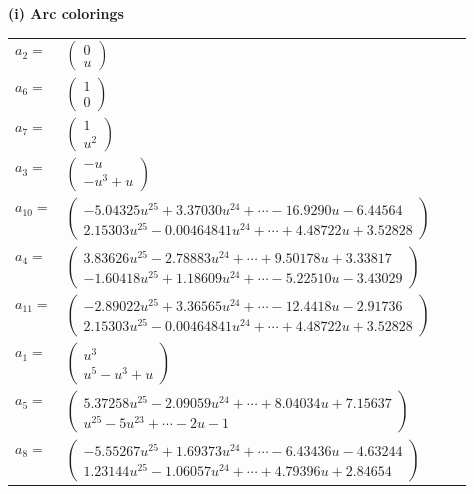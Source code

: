 \documentclass[1p]{elsarticle_modified}
\theoremstyle{definition}
\begin{document}
\flushleft \textbf{(i) Arc colorings}\\
\begin{tabular}{m{7pt} m{180pt} m{7pt} m{180pt} }
\flushright $a_{2}=$&$\begin{pmatrix}0\\u\end{pmatrix}$ \\
\flushright $a_{6}=$&$\begin{pmatrix}1\\0\end{pmatrix}$ \\
\flushright $a_{7}=$&$\begin{pmatrix}1\\u^2\end{pmatrix}$ \\
\flushright $a_{3}=$&$\begin{pmatrix}- u\\- u^3+u\end{pmatrix}$ \\
\flushright $a_{10}=$&$\begin{pmatrix}-5.04325 u^{25}+3.37030 u^{24}+\cdots-16.9290 u-6.44564\\2.15303 u^{25}-0.00464841 u^{24}+\cdots+4.48722 u+3.52828\end{pmatrix}$ \\
\flushright $a_{4}=$&$\begin{pmatrix}3.83626 u^{25}-2.78883 u^{24}+\cdots+9.50178 u+3.33817\\-1.60418 u^{25}+1.18609 u^{24}+\cdots-5.22510 u-3.43029\end{pmatrix}$ \\
\flushright $a_{11}=$&$\begin{pmatrix}-2.89022 u^{25}+3.36565 u^{24}+\cdots-12.4418 u-2.91736\\2.15303 u^{25}-0.00464841 u^{24}+\cdots+4.48722 u+3.52828\end{pmatrix}$ \\
\flushright $a_{1}=$&$\begin{pmatrix}u^3\\u^5- u^3+u\end{pmatrix}$ \\
\flushright $a_{5}=$&$\begin{pmatrix}5.37258 u^{25}-2.09059 u^{24}+\cdots+8.04034 u+7.15637\\u^{25}-5 u^{23}+\cdots-2 u-1\end{pmatrix}$ \\
\flushright $a_{8}=$&$\begin{pmatrix}-5.55267 u^{25}+1.69373 u^{24}+\cdots-6.43436 u-4.63244\\1.23144 u^{25}-1.06057 u^{24}+\cdots+4.79396 u+2.84654\end{pmatrix}$ \\

\end{tabular}
\end{document}
